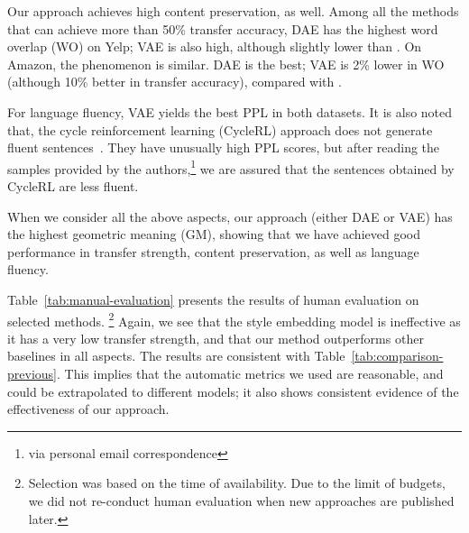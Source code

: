 \documentclass[11pt,a4paper]{article}
\begin{document}
Our approach achieves high content preservation, as well. 
Among all the methods that can achieve more than 50\% transfer accuracy, DAE has the highest word overlap (WO) on Yelp; VAE is also high, although slightly lower than \citet{li2018delete}. 
On Amazon, the phenomenon is similar. DAE is the best; VAE is 2\% lower in WO  (although 10\% better in transfer accuracy), compared with \citet{xu2018unpaired}.

For language fluency, VAE yields the best PPL in both datasets. It is also noted that, the cycle reinforcement learning (CycleRL) approach does not generate fluent sentences~\cite{xu2018unpaired}. They have unusually high PPL scores, but after reading the samples provided by the authors,\footnote{via personal email correspondence} we are assured that the sentences obtained by CycleRL are less fluent.

When we consider all the above aspects, our approach (either DAE or VAE) has the highest geometric meaning (GM), showing that we have achieved good performance in transfer strength, content preservation, as well as language fluency.

Table~\ref{tab:manual-evaluation} presents the results of human evaluation on selected methods.
\footnote{Selection was based on the time of availability. Due to the limit of budgets, we did not re-conduct human evaluation when new approaches are published later.} 
Again, we see that the style embedding model \cite{fu2018style} is ineffective as it has a very low transfer strength, and that our method outperforms other baselines in all aspects. The results are consistent with Table~\ref{tab:comparison-previous}. This implies that the automatic metrics we used are reasonable, and could be  extrapolated to different models; it also shows consistent evidence of the effectiveness of our approach.
\end{document}
